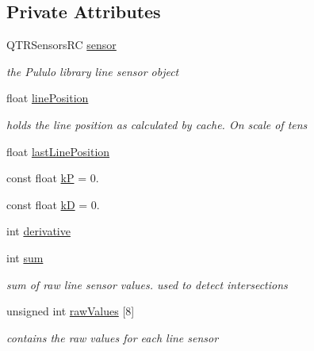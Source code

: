 \subsection*{Private Attributes}
\begin{DoxyCompactItemize}
\item 
Q\-T\-R\-Sensors\-R\-C \hyperlink{classLineSensor_aeb37399c033a623b620803434f2b278f}{sensor}
\begin{DoxyCompactList}\small\item\em the Pululo library line sensor object \end{DoxyCompactList}\item 
float \hyperlink{classLineSensor_ac21af83a73e9e55500324d9d34ed2498}{line\-Position}
\begin{DoxyCompactList}\small\item\em holds the line position as calculated by cache. On scale of tens \end{DoxyCompactList}\item 
float \hyperlink{classLineSensor_a347e843234a242ded12e83badf4718ed}{last\-Line\-Position}
\item 
const float \hyperlink{classLineSensor_af246497cb5a3386afcc4ce864949c57f}{k\-P} = 0.
\item 
const float \hyperlink{classLineSensor_a62c587ff3d58f72a74ae39429b7d0837}{k\-D} = 0.
\item 
int \hyperlink{classLineSensor_aa5bd7119b2332eab8b6c850f8fa3d558}{derivative}
\item 
int \hyperlink{classLineSensor_af574319adc88f5949f03239b2bcbc222}{sum}
\begin{DoxyCompactList}\small\item\em sum of raw line sensor values. used to detect intersections \end{DoxyCompactList}\item 
unsigned int \hyperlink{classLineSensor_ac60b7766a763cfc7378cb6b1387a7324}{raw\-Values} \mbox{[}8\mbox{]}
\begin{DoxyCompactList}\small\item\em contains the raw values for each line sensor \end{DoxyCompactList}\end{DoxyCompactItemize}
